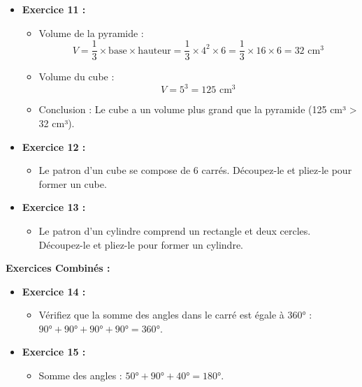 \documentclass{article}
\begin{document}
\begin{tcolorbox}[colback=green!10!white, colframe=green!75!black, title=\textcolor{white}{Corrections }, sharp corners=south]

    \begin{itemize}
        \item \textbf{Exercice 11 :} 
            \begin{itemize}
                \item Volume de la pyramide : 
                    \[
                    V = \frac{1}{3} \times \text{base} \times \text{hauteur} = \frac{1}{3} \times 4^2 \times 6 = \frac{1}{3} \times 16 \times 6 = 32 \text{ cm}^3
                    \]
                \item Volume du cube : 
                    \[
                    V = 5^3 = 125 \text{ cm}^3
                    \]
                \item Conclusion : Le cube a un volume plus grand que la pyramide (125 cm³ > 32 cm³).
            \end{itemize}

        \item \textbf{Exercice 12 :} 
            \begin{itemize}
                \item Le patron d'un cube se compose de 6 carrés. Découpez-le et pliez-le pour former un cube.
            \end{itemize}

        \item \textbf{Exercice 13 :} 
            \begin{itemize}
                \item Le patron d'un cylindre comprend un rectangle et deux cercles. Découpez-le et pliez-le pour former un cylindre.
            \end{itemize}
    \end{itemize}

    \vspace{10pt}

    \textbf{Exercices Combinés :}

    \begin{itemize}
        \item \textbf{Exercice 14 :} 
            \begin{itemize}
                \item Vérifiez que la somme des angles dans le carré est égale à 360° : \(90° + 90° + 90° + 90° = 360°\).
            \end{itemize}

        \item \textbf{Exercice 15 :} 
            \begin{itemize}
                \item Somme des angles : \(50° + 90° + 40° = 180°\). 
            \end{itemize}
    \end{itemize}

\end{tcolorbox}
\end{document}
